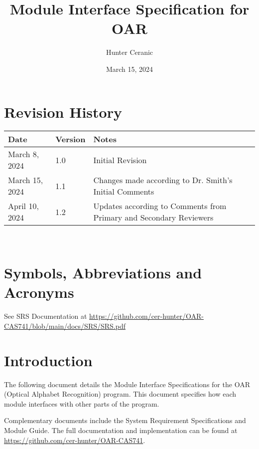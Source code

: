 \documentclass[12pt, titlepage]{article}
\begin{document}
\title{Module Interface Specification for OAR}

\author{Hunter Ceranic}

\date{March 15, 2024}

\maketitle


\section{Revision History}

\begin{tabularx}{\textwidth}{p{3cm}p{2cm}X}
\toprule {\bf Date} & {\bf Version} & {\bf Notes}\\
\midrule
March 8, 2024 & 1.0 & Initial Revision\\
March 15, 2024 & 1.1 & Changes made according to Dr. Smith's Initial Comments\\
April 10, 2024 & 1.2 & Updates according to Comments from Primary and Secondary Reviewers\\
\bottomrule
\end{tabularx}

~\newpage

\section{Symbols, Abbreviations and Acronyms}

See SRS Documentation \citep{SRS} at \url{https://github.com/cer-hunter/OAR-CAS741/blob/main/docs/SRS/SRS.pdf}

\newpage

\tableofcontents

\newpage


\section{Introduction}

The following document details the Module Interface Specifications for
the OAR (Optical Alphabet Recognition) program. This document specifies how each module
interfaces with other parts of the program.

Complementary documents include the System Requirement Specifications
and Module Guide.  The full documentation and implementation can be
found at \url{https://github.com/cer-hunter/OAR-CAS741}. 
\end{document}
